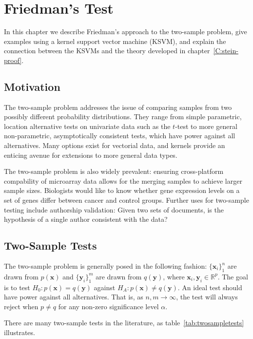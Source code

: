 \graphicspath{{./NIPS/img/}}
\chapter{Friedman's Test}
\label{C:friedman-test}
In this chapter we describe Friedman's approach to the two-sample
problem, give examples using a kernel support vector machine (KSVM), and
explain the connection between the KSVMs and the theory developed in
chapter~\ref{C:stein-proof}.

\section{Motivation}
The two-sample problem addresses the issue of comparing samples from
two possibly different probability distributions.  They range from
simple parametric, location alternative tests on univariate data such as the
$t$-test to more general non-parametric, asymptotically consistent tests, which
have power against all alternatives.  Many options exist for vectorial
data, and kernels provide an enticing avenue for extensions to more
general data types.

The two-sample problem is also widely prevalent: ensuring
cross-platform compability of microarray data allows for the merging
samples to achieve larger sample sizes.  Biologists would like to know
whether gene expression levels on a set of genes differ between cancer
and control groups.  Further uses for two-sample testing include
authorship validation: Given two sets of documents, is the hypothesis
of a single author consistent with the data?

\section{Two-Sample Tests}
The two-sample problem is generally posed in the following fashion: $\{
\mathbf{x}_i\}_1^n$ are drawn from $p(\mathbf{x})$ and
$\{\mathbf{y}_i\}_1^m$ are drawn from $q(\mathbf{y})$, where $\mathbf{x}_i,
\mathbf{y}_i \in \mathbb{R}^p$. The goal is to test $H_0:
p(\mathbf{x}) = q(\mathbf{y})$ against $H_A: p(\mathbf{x}) \neq
q(\mathbf{y})$. An ideal test should have power against all
alternatives. That is, as $n,m \to \infty$, the test
will always reject when $p \neq q$ for any non-zero significance level
$\alpha$. 

There are many two-sample tests in the literature, as
table~\ref{tab:twosampletests} illustrates.  


